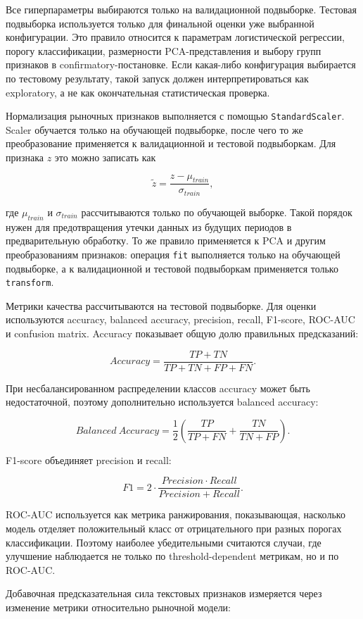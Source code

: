 Все гиперпараметры выбираются только на валидационной подвыборке. Тестовая подвыборка используется только для финальной оценки уже выбранной конфигурации. Это правило относится к параметрам логистической регрессии, порогу классификации, размерности PCA-представления и выбору групп признаков в confirmatory-постановке. Если какая-либо конфигурация выбирается по тестовому результату, такой запуск должен интерпретироваться как exploratory, а не как окончательная статистическая проверка.

Нормализация рыночных признаков выполняется с помощью \texttt{StandardScaler}. Scaler обучается только на обучающей подвыборке, после чего то же преобразование применяется к валидационной и тестовой подвыборкам. Для признака $z$ это можно записать как

\[
\tilde z = \frac{z - \mu_{train}}{\sigma_{train}},
\]

где $\mu_{train}$ и $\sigma_{train}$ рассчитываются только по обучающей выборке. Такой порядок нужен для предотвращения утечки данных из будущих периодов в предварительную обработку. То же правило применяется к PCA и другим преобразованиям признаков: операция \texttt{fit} выполняется только на обучающей подвыборке, а к валидационной и тестовой подвыборкам применяется только \texttt{transform}.

Метрики качества рассчитываются на тестовой подвыборке. Для оценки используются accuracy, balanced accuracy, precision, recall, F1-score, ROC-AUC и confusion matrix. Accuracy показывает общую долю правильных предсказаний:

\[
Accuracy = \frac{TP + TN}{TP + TN + FP + FN}.
\]

При несбалансированном распределении классов accuracy может быть недостаточной, поэтому дополнительно используется balanced accuracy:

\[
Balanced\ Accuracy = \frac{1}{2}\left(\frac{TP}{TP + FN} + \frac{TN}{TN + FP}\right).
\]

F1-score объединяет precision и recall:

\[
F1 = 2 \cdot \frac{Precision \cdot Recall}{Precision + Recall}.
\]

ROC-AUC используется как метрика ранжирования, показывающая, насколько модель отделяет положительный класс от отрицательного при разных порогах классификации. Поэтому наиболее убедительными считаются случаи, где улучшение наблюдается не только по threshold-dependent метрикам, но и по ROC-AUC.

Добавочная предсказательная сила текстовых признаков измеряется через изменение метрики относительно рыночной модели:

